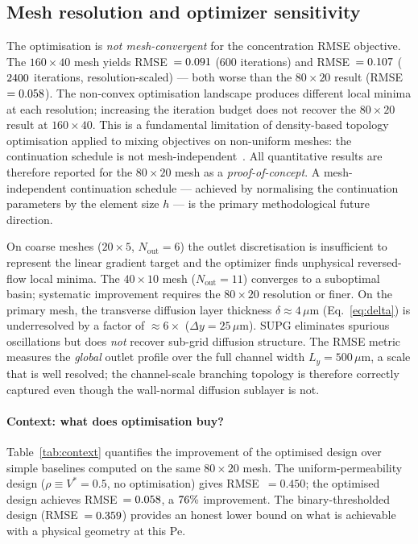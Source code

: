 \subsection{Mesh resolution and optimizer sensitivity}
\label{sec:mesh_limitation}
The optimisation is \emph{not mesh-convergent} for the
concentration RMSE objective.
The $160\times40$ mesh yields RMSE~$=0.091$ (600 iterations)
and RMSE~$=0.107$ ($2400$ iterations, resolution-scaled)
--- both worse than the $80\times20$ result (RMSE~$=0.058$).
The non-convex optimisation landscape produces different local minima
at each resolution; increasing the iteration budget does not recover
the $80\times20$ result at $160\times40$.
This is a fundamental limitation of density-based topology optimisation
applied to mixing objectives on non-uniform meshes: the continuation
schedule is not mesh-independent~\cite{lazarov2016}.
All quantitative results are therefore reported for the
$80\times20$ mesh as a \emph{proof-of-concept}.
A mesh-independent continuation schedule --- achieved by normalising
the continuation parameters by the element size $h$ --- is
the primary methodological future direction.

On coarse meshes ($20\times5$, $N_{\mathrm{out}}=6$) the outlet
discretisation is insufficient to represent the linear gradient target
and the optimizer finds unphysical reversed-flow local minima.
The $40\times10$ mesh ($N_{\mathrm{out}}=11$) converges to a
suboptimal basin; systematic improvement requires the $80\times20$
resolution or finer.
On the primary mesh, the transverse diffusion layer thickness
$\delta \approx 4\,\mu$m (Eq.~\eqref{eq:delta}) is underresolved by
a factor of $\approx 6\times$ ($\Delta y = 25\,\mu$m).
SUPG eliminates spurious oscillations but does \emph{not} recover
sub-grid diffusion structure.
The RMSE metric measures the \emph{global} outlet profile over the full
channel width $L_y = 500\,\mu$m, a scale that is well resolved;
the channel-scale branching topology is therefore correctly captured
even though the wall-normal diffusion sublayer is not.

\paragraph{Context: what does optimisation buy?}
Table~\ref{tab:context} quantifies the improvement of the
optimised design over simple baselines computed on the
same $80\times20$ mesh.
The uniform-permeability design ($\rho\equiv V^*=0.5$,
no optimisation) gives RMSE~$=0.450$;
the optimised design achieves RMSE~$=0.058$,
a $76\%$ improvement.
The binary-thresholded design (RMSE~$=0.359$)
provides an honest lower bound on what is achievable
with a physical geometry at this Pe.

